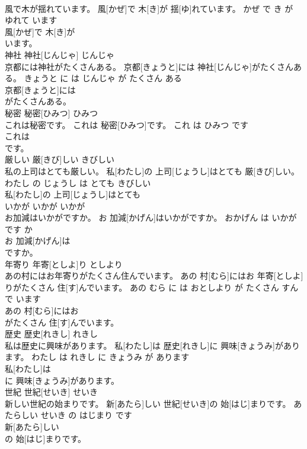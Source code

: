 \documentclass[8pt]{extreport}
\begin{document}
\begin{CJK}{UTF8}{min}
\\	風で木が揺れています。	風[かぜ]で 木[き]が 揺[ゆ]れています。	かぜ で き が ゆれて います	
\\	風[かぜ]で 木[き]が
\\	います。		
\\	神社	神社[じんじゃ]	じんじゃ	
\\	京都には神社がたくさんある。	京都[きょうと]には 神社[じんじゃ]がたくさんある。	きょうと に は じんじゃ が たくさん ある	
\\	京都[きょうと]には
\\	がたくさんある。		
\\	秘密	秘密[ひみつ]	ひみつ	
\\	これは秘密です。	これは 秘密[ひみつ]です。	これ は ひみつ です	
\\	これは
\\	です。		
\\	厳しい	厳[きび]しい	きびしい	
\\	私の上司はとても厳しい。	私[わたし]の 上司[じょうし]はとても 厳[きび]しい。	わたし の じょうし は とても きびしい	
\\	私[わたし]の 上司[じょうし]はとても
\\	いかが	いかが	いかが	
\\	お加減はいかがですか。	お 加減[かげん]はいかがですか。	おかげん は いかが です か	
\\	お 加減[かげん]は
\\	ですか。		
\\	年寄り	年寄[としよ]り	としより	
\\	あの村にはお年寄りがたくさん住んでいます。	あの 村[むら]にはお 年寄[としよ]りがたくさん 住[す]んでいます。	あの むら に は おとしより が たくさん すんで います	
\\	あの 村[むら]にはお
\\	がたくさん 住[す]んでいます。		
\\	歴史	歴史[れきし]	れきし	
\\	私は歴史に興味があります。	私[わたし]は 歴史[れきし]に 興味[きょうみ]があります。	わたし は れきし に きょうみ が あります	
\\	私[わたし]は
\\	に 興味[きょうみ]があります。		
\\	世紀	世紀[せいき]	せいき	
\\	新しい世紀の始まりです。	新[あたら]しい 世紀[せいき]の 始[はじ]まりです。	あたらしい せいき の はじまり です	
\\	新[あたら]しい
\\	の 始[はじ]まりです。		

\end{CJK}
\end{document}
